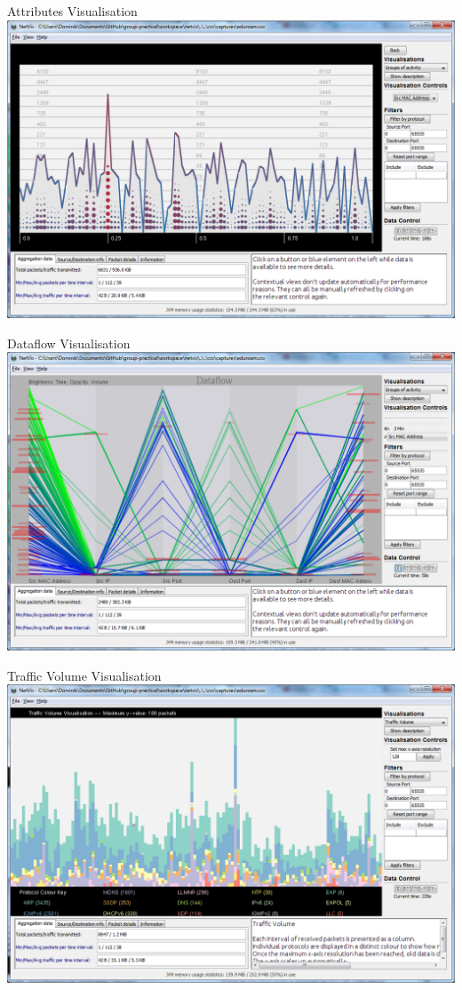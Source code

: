 \documentclass{beamer}
\begin{document}
    \begin{frame}{Attributes Visualisation}
	\includegraphics[width=\textwidth,keepaspectratio]{img/Attributes.png}
    \end{frame}

    \begin{frame}{Dataflow Visualisation}
	\includegraphics[width=\textwidth,keepaspectratio]{img/Dataflow.png}
    \end{frame}

    \begin{frame}{Traffic Volume Visualisation}
	\includegraphics[width=\textwidth,keepaspectratio]{img/TrafficVolume.png}
    \end{frame}
\end{document}
